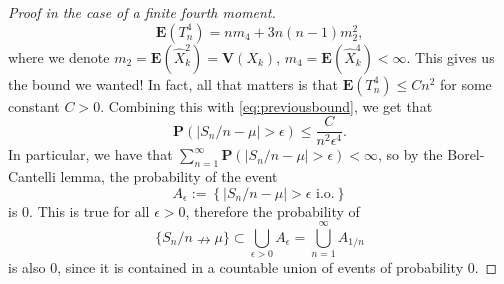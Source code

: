 \documentclass[12pt]{article}
\newcommand{\prob}{\mathbf{P}}
\newcommand{\expec}{\mathbf{E}}
\newcommand{\var}{\mathbf{V}}
\theoremstyle{example}
\begin{document}
\begin{proof}[Proof in the case of a finite fourth moment]
$$
\expec(T_n^4) = n m_4 + 3n(n-1) m_2^2, $$
where we denote $m_2 = \expec(\hat{X}_k^2) = \var(X_k)$, $m_4=\expec(\hat{X}_k^4)<\infty$. This gives us the bound we wanted! In fact, all that matters is that $\expec(T_n^4)\le C n^2$ for some constant $C>0$. Combining this with \eqref{eq:previousbound}, we get that
$$ \prob(|S_n/n-\mu|>\epsilon) \le \frac{C}{n^2 \epsilon^4}. $$
In particular, we have that $ \sum_{n=1}^\infty \prob(|S_n/n-\mu|>\epsilon) <\infty$, so by the Borel-Cantelli lemma,
the probability of the event
$$A_\epsilon := \left\{|S_n/n-\mu|>\epsilon \textrm{ i.o.}\right\} $$
is $0$. This is true for all $\epsilon>0$, therefore the probability of 
$$ \{S_n/n\nrightarrow \mu\} \subset \bigcup_{\epsilon>0} A_\epsilon = \bigcup_{n=1}^\infty A_{1/n} $$
is also $0$, since it is contained in a countable union of events of probability 0.
\end{proof}
\end{document}

